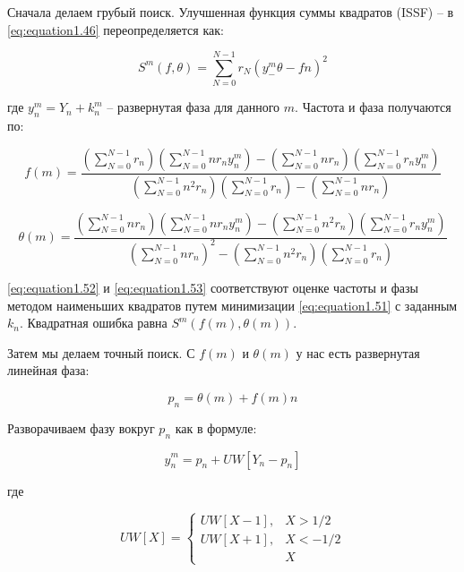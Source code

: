 Сначала делаем грубый поиск. Улучшенная функция суммы квадратов (ISSF) -- в \ref{eq:equation1.46} переопределяется как:

\begin{equation}
	\label{eq:equation1.51}	
	S^m(f,\theta) =\sum^{N-1}_{N=0} r_N(y^m_ -\theta-fn)^2
\end{equation}

где $y^m_n = Y_n + k^m_n$ -- развернутая фаза для данного $m$. Частота и фаза получаются по:

\begin{equation}
	\label{eq:equation1.52}	
	f(m) = \frac{(\sum^{N-1}_{N=0}r_n) (\sum^{N-1}_{N=0}n r_n y^m_n)- (\sum^{N-1}_{N=0}n r_n)(\sum^{N-1}_{N=0}r_n y^m_n) }                           {(\sum^{N-1}_{N=0}n^2 r_n)(\sum^{N-1}_{N=0}r_n)-(\sum^{N-1}_{N=0}nr_n)}
\end{equation}

\begin{equation}
	\label{eq:equation1.53}		
	\theta(m) = \frac{(\sum^{N-1}_{N=0}nr_n) (\sum^{N-1}_{N=0}n r_n y^m_n)- (\sum^{N-1}_{N=0}n^2 r_n)(\sum^{N-1}_{N=0}r_n y^m_n) }                          {(\sum^{N-1}_{N=0}n r_n)^2 - (\sum^{N-1}_{N=0}n^2 r_n)(\sum^{N-1}_{N=0}r_n)}
\end{equation}

\ref{eq:equation1.52} и \ref{eq:equation1.53}	 соответствуют оценке частоты и фазы методом наименьших квадратов путем минимизации \ref{eq:equation1.51} с заданным $k_n$. Квадратная ошибка равна $S^m (f (m), \theta (m))$.

Затем мы делаем точный поиск. С $f (m)$ и $\theta (m)$ у нас есть развернутая линейная фаза:

\begin{equation}
	\label{eq:equation1.54}	
	p_n= \theta(m)+f(m)n
\end{equation}

Разворачиваем фазу вокруг $p_n$ как в формуле:

\begin{equation}
	\label{eq:equation1.55}	
	\hat{y}^m_n =p_n +UW[Y_n-p_n]
\end{equation}

где

\begin{equation}
	\label{eq:equation1.56}	
	UW[X] = \left\{ \begin{array}{ll}
		UW[X-1], & \textrm{$X>1/2$}\\
		UW[X+1], & \textrm{$X<-1/2$}\\
		& \textrm{$X$}
	\end{array} \right.
\end{equation}



